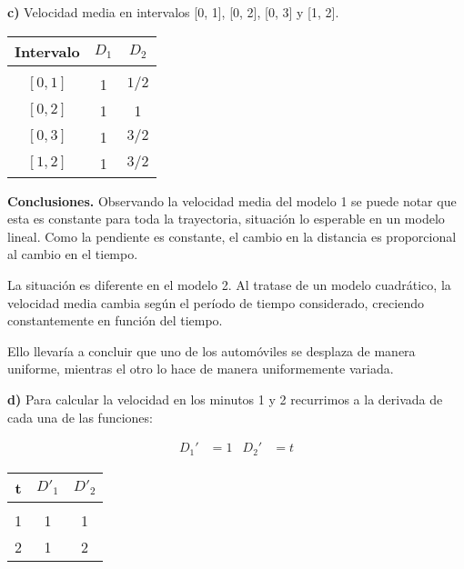 \textbf{c)} Velocidad media en intervalos [0, 1], [0, 2], [0, 3] y [1, 2].

\begin{center}
    \begin{tabular}{ c c c }
        Intervalo & $D_1$ & $D_2$ \\
        \hline    &               \\ [-1em]
        $[0, 1]$  & 1     & $1/2$ \\
        $[0, 2]$  & 1     & 1     \\
        $[0, 3]$  & 1     & $3/2$ \\
        $[1, 2]$  & 1     & $3/2$ \\
        \hline
    \end{tabular}
\end{center}

\textbf{Conclusiones.}
Observando la velocidad media del modelo 1 se puede notar que esta es constante para toda la trayectoria,
situación lo esperable en un modelo lineal.
Como la pendiente es constante,
el cambio en la distancia es proporcional al cambio en el tiempo.

La situación es diferente en el modelo 2.
Al tratase de un modelo cuadrático,
la velocidad media cambia según el período de tiempo considerado,
creciendo constantemente en función del tiempo.

Ello llevaría a concluir que uno de los automóviles se desplaza de manera uniforme,
mientras el otro lo hace de manera uniformemente variada.

\vspace{10pt}

\textbf{d)} Para calcular la velocidad en los minutos 1 y 2 recurrimos a la derivada de cada una de las funciones:

\begin{align*}
    D_1' & = 1 &
    D_2' & = t
\end{align*}

\begin{center}
    \begin{tabular}{ c c c }
        t      & $D'_1$ & $D'_2$ \\
        \hline &                 \\ [-1em]
        1      & 1      & 1      \\
        2      & 1      & 2      \\
        \hline
    \end{tabular}
\end{center}

